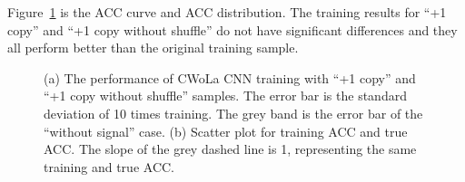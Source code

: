 \documentclass[12pt]{article}
\begin{document}
		Figure~\ref{fig:cwola_cnn_training_performance_copy_1_wo_shuffle} is the ACC curve and ACC distribution. The training results for ``+1 copy'' and ``+1 copy without shuffle'' do not have significant differences and they all perform better than the original training sample.
		\begin{figure}[htpb]
			\centering
			\caption{(a) The performance of CWoLa CNN training with ``+1 copy'' and ``+1 copy without shuffle'' samples. The error bar is the standard deviation of 10 times training. The grey band is the error bar of the ``without signal'' case. (b) Scatter plot for training ACC and true ACC. The slope of the grey dashed line is 1, representing the same training and true ACC.}
			\label{fig:cwola_cnn_training_performance_copy_1_wo_shuffle}
		\end{figure}
\end{document}
